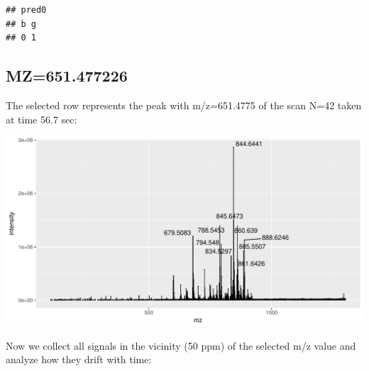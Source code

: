 \documentclass[]{article}
\newenvironment{Shaded}{\begin{snugshade}}{\end{snugshade}}
\newcommand{\KeywordTok}[1]{\textcolor[rgb]{0.13,0.29,0.53}{\textbf{#1}}}
\newcommand{\FloatTok}[1]{\textcolor[rgb]{0.00,0.00,0.81}{#1}}
\newcommand{\StringTok}[1]{\textcolor[rgb]{0.31,0.60,0.02}{#1}}
\newcommand{\OperatorTok}[1]{\textcolor[rgb]{0.81,0.36,0.00}{\textbf{#1}}}
\newcommand{\NormalTok}[1]{#1}
\begin{document}
\begin{verbatim}
## pred0
## b g 
## 0 1
\end{verbatim}

\subsection{MZ=651.477226}\label{mz651.477226}

\begin{Shaded}
\end{Shaded}

The selected row represents the peak with m/z=651.4775 of the scan N=42
taken at time 56.7 sec:

\begin{Shaded}
\end{Shaded}

\includegraphics{Supplementary_document_files/figure-latex/ion.plots.651-1.pdf}

Now we collect all signals in the vicinity (50 ppm) of the selected m/z
value and analyze how they drift with time:

\begin{Shaded}
\end{Shaded}
\end{document}

